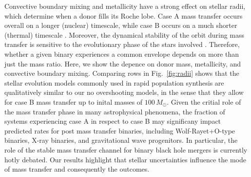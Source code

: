 \documentclass[twocolumn]{aastex63}
\DeclareRobustCommand{\Figref}[1]{Fig.~\ref{#1}}
\begin{document}
Convective boundary mixing \cite{brott:11, johnston:24} and
metallicity have a strong effect on stellar radii, which determine
when a donor fills its Roche lobe. Case A mass transfer occurs overall
on a longer (nuclear) timescale, while case B occurs on a much shorter
(thermal) timescale \citep[but see][]{klencki:22}. Moreover, the
dynamical stability of the orbit during mass transfer is sensitive to the evolutionary phase of the stars involved
\citep[e.g.,][]{claeys:14}. Therefore, whether a given binary
experiences a common envelope depends on more than just the mass
ratio. Here, we show the depence on donor mass, metallicity, and
convective boundary mixing. Comparing rows in \Figref{fig:radii}
shows that the stellar evolution models commonly used in rapid
population synthesis are qualitatively similar to our no overshooting
models, in the sense that they allow for case B mass transfer up to
inital masses of $100 \, M_{\odot}$. Given the critial role of the
mass transfer phase in many astrophysical phenomena, the fraction of
systems experiencing case A in respect to case B may significany
impact predicted rates for post mass transfer binaries, including
Wolf-Rayet+O-type binaries, X-ray binaries, and gravitational wave
progenitors. In particular, the role of the stable mass transfer
channel \citep[e.g.,][]{marchant:21, vanson:22} for binary black hole
mergers is currently hotly debated. Our results highlight that stellar
uncertainties influence the mode of mass transfer and consequently the
outcomes.



\end{document}
